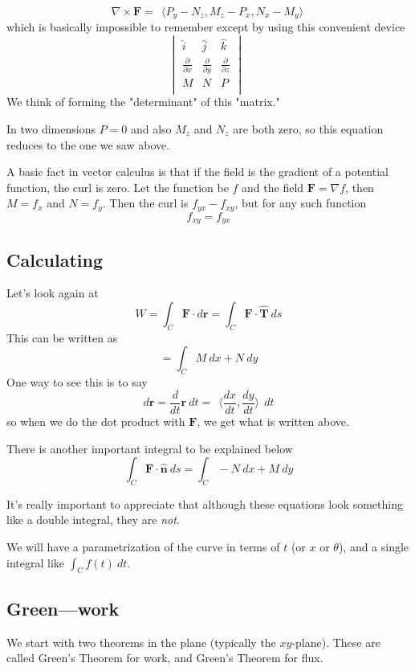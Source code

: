 \documentclass[11pt, oneside]{article}
\begin{document}
\[ \nabla \times \mathbf{F} =  \ \ \langle P_y-N_z,M_z-P_x,N_x-M_y \rangle \  \]
which is basically impossible to remember except by using this convenient device
\[
\begin{vmatrix} 
  \hat{i}  &  \hat{j} & \hat{k} \\ 
  \frac{\partial}{\partial x}  &  \frac{\partial}{\partial y} & \frac{\partial}{\partial z} \\ 
  M  & N & P \\ 
\end{vmatrix} \ \
\]
We think of forming the "determinant" of this "matrix."

In two dimensions $P=0$ and also $M_z$ and $N_z$ are both zero, so this equation reduces to the one we saw above.

A basic fact in vector calculus is that if the field is the gradient of a potential function, the curl is zero.  Let the function be $f$ and the field $\mathbf{F} = \nabla f$, then $M=f_x$ and $N=f_y$.  Then the curl is $f_{yx}- f_{xy}$, but for any such function
\[ f_{xy} = f_{yx} \]

\subsection*{Calculating}
Let's look again at
\[ W = \int_C \mathbf{F} \cdot d\mathbf{r} = \int_C \mathbf{F} \cdot \hat{\mathbf{T}} \ ds \]
This can be written as
\[ = \int_C M \ dx + N \ dy  \]
One way to see this is to say
\[ d\mathbf{r} = \frac{d}{dt} \mathbf{r} \ dt = \ \ \langle \frac{dx}{dt},\frac{dy}{dt} \rangle \  \ dt \]
so when we do the dot product with $\mathbf{F}$, we get what is written above.

There is another important integral to be explained below
\[ \int_C \mathbf{F} \cdot \hat{\mathbf{n}} \  ds = \int_C -N \ dx + M \ dy  \]

It's really important to appreciate that although these equations look something like a double integral, they are \emph{not}.

We will have a parametrization of the curve in terms of $t$ (or $x$ or $\theta$), and a single integral like $\int_C f(t) \ dt $.

\subsection*{Green---work}
We start with two theorems in the plane (typically the $xy$-plane).  These are called Green's Theorem for work, and Green's Theorem for flux.  
\end{document}
